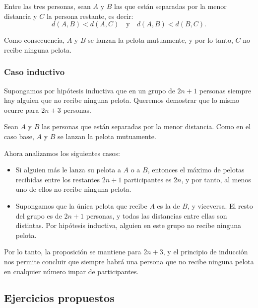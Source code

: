 Entre las tres personas, sean \( A \) y \( B \) las que están separadas por la menor distancia y \( C \) la persona restante, es decir:
\[
  d(A,B) < d(A,C) \quad \text{y} \quad d(A,B) < d(B,C).
\]

Como consecuencia, \( A \) y \( B \) se lanzan la pelota mutuamente, y por lo tanto, \( C \) no recibe ninguna pelota.


\subsubsection*{Caso inductivo}

Supongamos por hipótesis inductiva que en un grupo de \( 2n+1 \) personas siempre hay alguien que no recibe ninguna pelota. 
Queremos demostrar que lo mismo ocurre para \( 2n+3 \) personas.

Sean \( A \) y \( B \) las personas que están separadas por la menor distancia. Como en el caso base, \( A \) y \( B \) se lanzan la pelota mutuamente.

Ahora analizamos los siguientes casos:

\begin{itemize}
    \item Si alguien más le lanza su pelota a \( A \) o a \( B \), entonces el máximo de pelotas recibidas entre los restantes \( 2n+1 \) participantes es \( 2n \), y por tanto, al menos uno de ellos no recibe ninguna pelota.
    
    \item Supongamos que la única pelota que recibe \( A \) es la de \( B \), y viceversa. El resto del grupo es de \( 2n+1 \) personas, y todas las distancias entre ellas son distintas. Por hipótesis inductiva, alguien en este grupo no recibe ninguna pelota.
\end{itemize}

Por lo tanto, la proposición se mantiene para \( 2n+3 \), y el principio de inducción nos permite concluir que siempre habrá una persona que no recibe ninguna pelota en cualquier número impar de participantes.


\subsection{Ejercicios propuestos}

